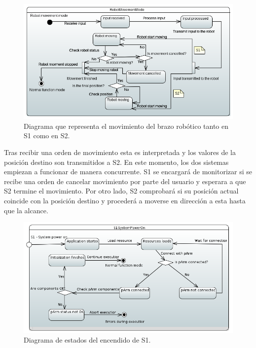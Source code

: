 \begin{figure}[H]
    \centering
    \includegraphics[width=\linewidth]{pictures/S1RobotMovementMode.PNG}
    \caption{Diagrama que representa el movimiento del brazo robótico tanto en \ac{S1} como en \ac{S2}.}
    \label{fig:diagrama_estados_movimiento_s1}
\end{figure}

Tras recibir una orden de movimiento esta es interpretada y los valores de la posición destino son transmitidos a \ac{S2}. En este momento, los dos sistemas empiezan a funcionar de manera concurrente.
\ac{S1} se encargará de monitorizar si se recibe una orden de cancelar movimiento por parte del usuario y esperara a que \ac{S2} termine el movimiento.
Por otro lado, \ac{S2} comprobará si su posición actual coincide con la posición destino y procederá a moverse en dirección a esta hasta que la alcance.

\begin{figure}[H]
    \centering
    \includegraphics[width=\linewidth]{pictures/S1SystemPowerOn.PNG}
    \caption{Diagrama de estados del encendido de \ac{S1}.}
    \label{fig:diagrama_estados_encendido_s1}
\end{figure}

